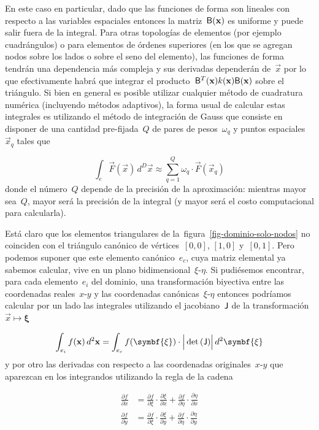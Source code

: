 \documentclass[
  12pt,
  a4paper,
  table]{scrbook}
\theoremstyle{plain}
\theoremstyle{definition}
\theoremstyle{plain}
\theoremstyle{plain}
\theoremstyle{remark}
\begin{document}
En este caso en particular, dado que las funciones de forma son lineales
con respecto a las variables espaciales entonces la
matriz~\(\mathsf{B}(\mathbf{x})\) es uniforme y puede salir fuera de la
integral. Para otras topologías de elementos (por ejemplo cuadrángulos)
o para elementos de órdenes superiores (en los que se agregan nodos
sobre los lados o sobre el seno del elemento), las funciones de forma
tendrán una dependencia más compleja y sus derivadas dependerán
de~\(\vec{x}\) por lo que efectivamente habrá que integrar el
producto~\(\mathsf{B}^T(\mathbf{x}) k(\mathbf{x}) \mathsf{B}(\mathbf{x})\) sobre el
triángulo. Si bien en general es posible utilizar cualquier método de
cuadratura numérica (incluyendo métodos adaptivos), la forma usual de
calcular estas integrales es utilizando el método de integración de
Gauss que consiste en disponer de una cantidad pre-fijada~\(Q\) de pares
de pesos~\(\omega_q\) y puntos espaciales~\(\vec{x}_q\) tales que

\[
\int_e \vec{F}(\vec{x}) \, d^D \vec{x} \approx \sum_{q=1}^Q \omega_q \cdot \vec{F}(\vec{x}_q)
\] donde el número~\(Q\) depende de la precisión de la aproximación:
mientras mayor sea~\(Q\), mayor será la precisión de la integral (y
mayor será el costo computacional para calcularla).

Está claro que los elementos triangulares de
la~figura~\ref{fig-dominio-solo-nodos} no coinciden con el triángulo
canónico de vértices~\([0,0]\), \([1,0]\) y~\([0,1]\). Pero podemos
suponer que este elemento canónico~\(e_c\), cuya matriz elemental ya
sabemos calcular, vive en un plano bidimensional~\(\xi\)-\(\eta\). Si
pudiésemos encontrar, para cada elemento~\(e_i\) del dominio, una
transformación biyectiva entre las coordenadas reales~\(x\)-\(y\) y las
coordenadas canónicas~\(\xi\)-\(\eta\) entonces podríamos calcular por
un lado las integrales utilizando el jacobiano~\(\mathsf{J}\) de la
transformación~\(\vec{x} \mapsto \symbf{\xi}\)

\[
\int_{e_i} f(\vec{x}) \, d^2\vec{x} = \int_{e_c} f(\symbf{\xi}) \cdot \Big| \det{(\mat{J})} \Big| \, d^2\symbf{\xi}
\] y por otro las derivadas con respecto a las coordenadas
originales~\(x\)-\(y\) que aparezcan en los integrandos utilizando la
regla de la cadena

\[
\begin{aligned}
\frac{\partial f}{\partial x} &= \frac{\partial f}{\partial \xi} \cdot \frac{\partial \xi}{\partial x} + \frac{\partial f}{\partial \eta} \cdot \frac{\partial \eta}{\partial x} \\
\frac{\partial f}{\partial y} &= \frac{\partial f}{\partial \xi} \cdot \frac{\partial \xi}{\partial y} + \frac{\partial f}{\partial \eta} \cdot \frac{\partial \eta}{\partial y} \\
\end{aligned}
\]
\end{document}
